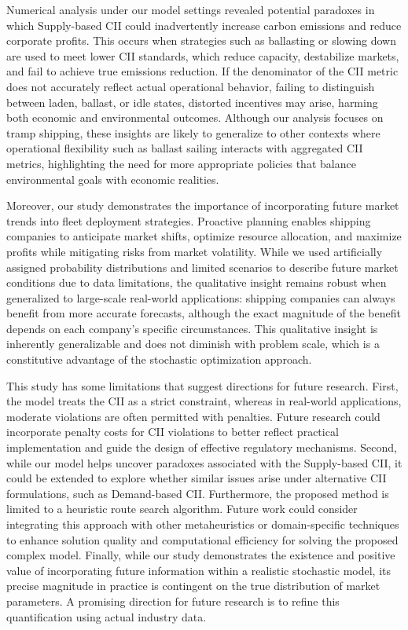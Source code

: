 \documentclass[11pt,english]{article}
\begin{document}
Numerical analysis under our model settings revealed potential paradoxes in which Supply-based CII could inadvertently increase carbon emissions and reduce corporate profits. This occurs when strategies such as ballasting or slowing down are used to meet lower CII standards, which reduce capacity, destabilize markets, and fail to achieve true emissions reduction. If the denominator of the CII metric does not accurately reflect actual operational behavior, failing to distinguish between laden, ballast, or idle states, distorted incentives may arise, harming both economic and environmental outcomes. Although our analysis focuses on tramp shipping, these insights are likely to generalize to other contexts where operational flexibility such as ballast sailing interacts with aggregated CII metrics, highlighting the need for more appropriate policies that balance environmental goals with economic realities.

Moreover, our study demonstrates the importance of incorporating future market trends into fleet deployment strategies. Proactive planning enables shipping companies to anticipate market shifts, optimize resource allocation, and maximize profits while mitigating risks from market volatility. While we used artificially assigned probability distributions and limited scenarios to describe future market conditions due to data limitations, the qualitative insight remains robust when generalized to large-scale real-world applications: shipping companies can always benefit from more accurate forecasts, although the exact magnitude of the benefit depends on each company's specific circumstances. This qualitative insight is inherently generalizable and does not diminish with problem scale, which is a constitutive advantage of the stochastic optimization approach.
 
This study has some limitations that suggest directions for future research. First, the model treats the CII as a strict constraint, whereas in real-world applications, moderate violations are often permitted with penalties. Future research could incorporate penalty costs for CII violations to better reflect practical implementation and guide the design of effective regulatory mechanisms. Second, while our model helps uncover paradoxes associated with the Supply-based CII, it could be extended to explore whether similar issues arise under alternative CII formulations, such as Demand-based CII.  Furthermore, the proposed method is limited to a heuristic route search algorithm. Future work could consider integrating this approach with other metaheuristics or domain-specific techniques to enhance solution quality and computational efficiency for solving the proposed complex model. Finally, while our study demonstrates the existence and positive value of incorporating future information within a realistic stochastic model, its precise magnitude in practice is contingent on the true distribution of market parameters. A promising direction for future research is to refine this quantification using actual industry data.
\end{document}
